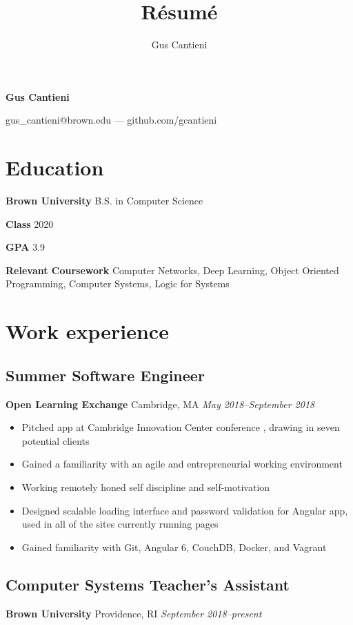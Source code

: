\documentclass[11pt]{article}
\title{R\'esum\'e}
\author{Gus Cantieni}
\makeatletter
\renewcommand{\maketitle}{
	\begin{center}
		{\huge\bfseries Gus Cantieni}
		\vspace{0.20em}

		gus\_cantieni@brown.edu --- github.com/gcantieni
		\vspace{-1.50em}
	\end{center}
}
\makeatother
\begin{document}
\maketitle
\section{Education}
\begin{minipage}{20em}
	\textbf{Brown University} B.S. in Computer Science

	\textbf{Class} 2020

	\textbf{GPA} 3.9

\end{minipage}
\begin{minipage}{25em}

	\textbf{Relevant Coursework} Computer Networks, Deep Learning, Object Oriented Programming, Computer Systems, Logic for Systems
\end{minipage}

\section{Work experience} 
\subsection{Summer Software Engineer} 
\textbf{Open Learning Exchange} Cambridge, MA \hfill \textit{May 2018--September 2018}
\begin{itemize}
	\item Pitched app at Cambridge Innovation Center conference , drawing in seven potential clients
	\item Gained a familiarity with an agile and entrepreneurial working environment
	\item Working remotely honed self discipline and self-motivation
	\item Designed scalable loading interface and password validation for Angular app, used in all of the sites currently running pages 
	\item Gained familiarity with Git, Angular 6, CouchDB, Docker, and Vagrant
\end{itemize}

\subsection{Computer Systems Teacher's Assistant}
\textbf{Brown University} Providence, RI \hfill \textit{September 2018--present}
\end{document}
